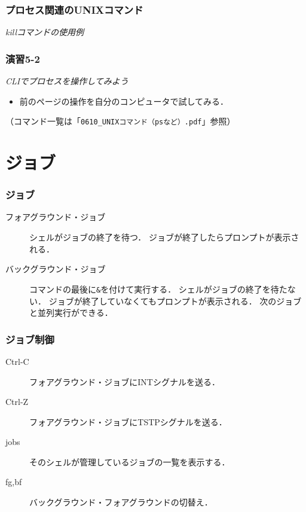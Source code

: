 \documentclass{beamer}                 %
\begin{document}
\begin{frame}[fragile]
  \frametitle{プロセス関連のUNIXコマンド}
  \emph{killコマンドの使用例}
\end{frame}

\begin{frame}[fragile]
  \frametitle{演習5-2}
  \emph{CLIでプロセスを操作してみよう}
\begin{itemize}
\item 前のページの操作を自分のコンピュータで試してみる．
\end{itemize}
  （コマンド一覧は「\texttt{0610\_UNIXコマンド（psなど）.pdf}」参照）
\end{frame}

\section{ジョブ}
\begin{frame}[fragile]
  \frametitle{ジョブ}
  \begin{description}
  \item[フォアグラウンド・ジョブ]
    シェルがジョブの終了を待つ．
    ジョブが終了したらプロンプトが表示される．

  \item[バックグラウンド・ジョブ]
    コマンドの最後に\texttt{\&}を付けて実行する．
    シェルがジョブの終了を待たない．
    ジョブが終了していなくてもプロンプトが表示される．
    次のジョブと並列実行ができる．
  \end{description}
\end{frame}

\begin{frame}[fragile]
  \frametitle{ジョブ制御}
  \begin{description}
  \item[Ctrl-C] フォアグラウンド・ジョブにINTシグナルを送る．
  \item[Ctrl-Z] フォアグラウンド・ジョブにTSTPシグナルを送る．
  \item[jobs] そのシェルが管理しているジョブの一覧を表示する．
  \item[fg,bf] バックグラウンド・フォアグラウンドの切替え．
  \end{description}
\end{frame}
\end{document}
